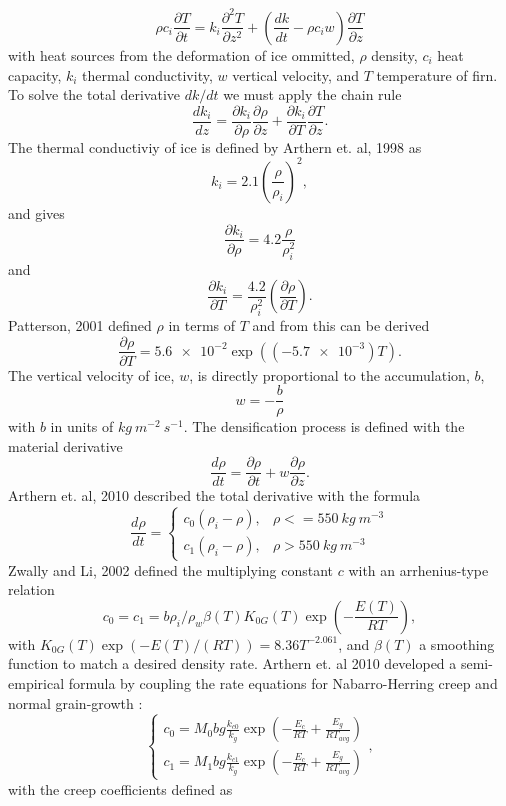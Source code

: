 \documentclass{article}%
\begin{document}
  $$
  \rho c_i \frac{\partial T}{\partial t} = 
    k_i \frac{\partial^2 T}{\partial z^2} +
    \left( \frac{dk}{dt} - \rho c_i w \right) \frac{\partial T}{\partial z}
  $$
with heat sources from the deformation of ice ommitted, $\rho$ density, $c_i$ heat capacity, $k_i$ thermal conductivity, $w$ vertical velocity, and $T$ temperature of firn.  To solve the total derivative $dk/dt$ we must apply the chain rule
  $$
  \frac{dk_i}{dz} = 
  \frac{\partial k_i}{\partial \rho} \frac{\partial \rho}{\partial z} + 
  \frac{\partial k_i}{\partial T} \frac{\partial T}{\partial z}.
  $$
The thermal conductiviy of ice is defined by Arthern et. al, 1998 as
  $$k_i = 2.1 \left(\frac{\rho}{\rho_i}\right)^2,$$
and gives
  $$
  \frac{\partial k_i}{\partial \rho} = 
    4.2 \frac{\rho}{\rho_i^2}
  $$
and
  $$
  \frac{\partial k_i}{\partial T} = 
    \frac{4.2}{\rho_i^2} \left( \frac{\partial \rho}{\partial T} \right).
  $$
Patterson, 2001 defined $\rho$ in terms of $T$ and from this can be derived
  $$
  \frac{\partial \rho}{\partial T} = 
    \SI{5.6e-2} \exp ((\SI{-5.7e-3})T).
  $$
The vertical velocity of ice, $w$, is directly proportional to the accumulation, $b$,
  $$
  w = -\frac{b}{\rho}
  $$
with $b$ in units of $kg\ m^{-2}\ s^{-1}$.  The densification process is defined with the material derivative
  $$\frac{d \rho}{dt} = \frac{\partial \rho}{\partial t} + 
    w\frac{\partial \rho}{\partial z}.$$
Arthern et. al, 2010 described the total derivative with the formula  
  $$
  \frac{d \rho}{dt} = 
  \begin{cases}
   c_0(\rho_i - \rho), &\rho <= 550\ kg\ m^{-3}\\
   c_1(\rho_i - \rho), &\rho > 550\ kg\ m^{-3}
  \end{cases}$$
Zwally and Li, 2002 defined the multiplying constant $c$ with an arrhenius-type relation
  $$
  c_0 = c_1 = 
  b \rho_i / \rho_w \beta(T)K_{0G}(T)\exp \left( -\frac{E(T)}{RT} \right),
  $$
with $K_{0G}(T) \exp(-E(T)/(RT)) = 8.36T^{-2.061}$, and $\beta(T)$ a smoothing function to match a desired density rate.  Arthern et. al 2010 developed a semi-empirical formula by coupling the rate equations for Nabarro-Herring creep and normal grain-growth : 
  $$
  \begin{cases}
    c_0 = M_0 bg\frac{k_{c0}}{k_g}\exp\left(-\frac{E_c}{RT} + 
          \frac{E_g}{RT_{avg}}\right)\\
    c_1 = M_1 bg\frac{k_{c1}}{k_g}\exp\left(-\frac{E_c}{RT} + 
          \frac{E_g}{RT_{avg}}\right)
  \end{cases},
  $$
with the creep coefficients defined as
\end{document}
